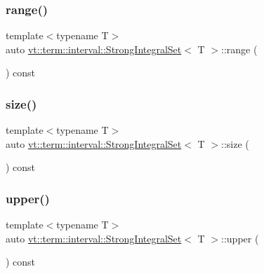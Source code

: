 \subsubsection{\texorpdfstring{range()}{range()}}
{\footnotesize\ttfamily template$<$typename T$>$ \\
auto \hyperlink{structvt_1_1term_1_1interval_1_1_strong_integral_set}{vt\+::term\+::interval\+::\+Strong\+Integral\+Set}$<$ T $>$\+::range (\begin{DoxyParamCaption}{ }\end{DoxyParamCaption}) const\hspace{0.3cm}{\ttfamily [inline]}}

\mbox{\label{structvt_1_1term_1_1interval_1_1_strong_integral_set_a4627bb98f3f3554a389749e34f8bdef4}} 
\subsubsection{\texorpdfstring{size()}{size()}}
{\footnotesize\ttfamily template$<$typename T$>$ \\
auto \hyperlink{structvt_1_1term_1_1interval_1_1_strong_integral_set}{vt\+::term\+::interval\+::\+Strong\+Integral\+Set}$<$ T $>$\+::size (\begin{DoxyParamCaption}{ }\end{DoxyParamCaption}) const\hspace{0.3cm}{\ttfamily [inline]}}

\mbox{\label{structvt_1_1term_1_1interval_1_1_strong_integral_set_a49bbf645bde26d0c9afba3d4c18bba9b}} 
\subsubsection{\texorpdfstring{upper()}{upper()}}
{\footnotesize\ttfamily template$<$typename T$>$ \\
auto \hyperlink{structvt_1_1term_1_1interval_1_1_strong_integral_set}{vt\+::term\+::interval\+::\+Strong\+Integral\+Set}$<$ T $>$\+::upper (\begin{DoxyParamCaption}{ }\end{DoxyParamCaption}) const\hspace{0.3cm}{\ttfamily [inline]}}



